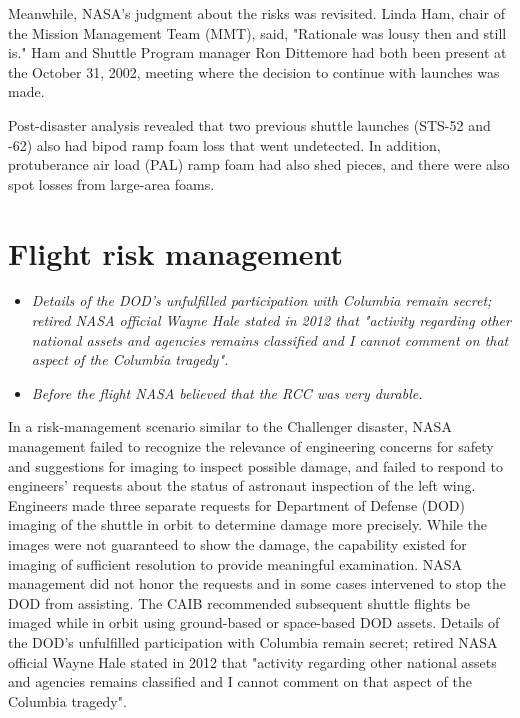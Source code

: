 Meanwhile, NASA's judgment about the risks was revisited. Linda Ham,
chair of the Mission Management Team (MMT), said, "Rationale was lousy
then and still is." Ham and Shuttle Program manager Ron Dittemore had
both been present at the October 31, 2002, meeting where the decision to
continue with launches was made.

Post-disaster analysis revealed that two previous shuttle launches
(STS-52 and -62) also had bipod ramp foam loss that went undetected. In
addition, protuberance air load (PAL) ramp foam had also shed pieces,
and there were also spot losses from large-area foams.

\section{Flight risk management}\label{flight-risk-management}

\begin{itemize}
\item
  \emph{Details of the DOD's unfulfilled participation with Columbia
  remain secret; retired NASA official Wayne Hale stated in 2012 that
  "activity regarding other national assets and agencies remains
  classified and I cannot comment on that aspect of the Columbia
  tragedy".}
\item
  \emph{Before the flight NASA believed that the RCC was very durable.}
\end{itemize}

In a risk-management scenario similar to the Challenger disaster, NASA
management failed to recognize the relevance of engineering concerns for
safety and suggestions for imaging to inspect possible damage, and
failed to respond to engineers' requests about the status of astronaut
inspection of the left wing. Engineers made three separate requests for
Department of Defense (DOD) imaging of the shuttle in orbit to determine
damage more precisely. While the images were not guaranteed to show the
damage, the capability existed for imaging of sufficient resolution to
provide meaningful examination. NASA management did not honor the
requests and in some cases intervened to stop the DOD from assisting.
The CAIB recommended subsequent shuttle flights be imaged while in orbit
using ground-based or space-based DOD assets. Details of the DOD's
unfulfilled participation with Columbia remain secret; retired NASA
official Wayne Hale stated in 2012 that "activity regarding other
national assets and agencies remains classified and I cannot comment on
that aspect of the Columbia tragedy".


